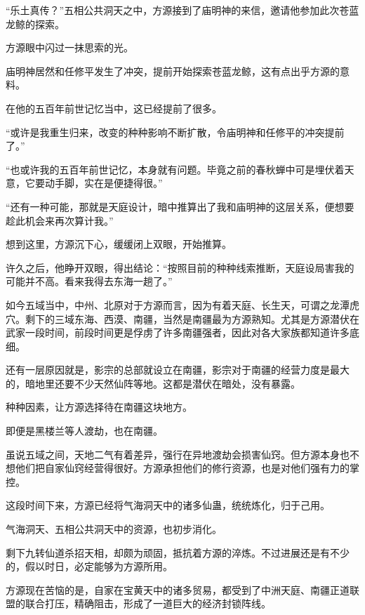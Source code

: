 
\begin{this_body}



“乐土真传？”五相公共洞天之中，方源接到了庙明神的来信，邀请他参加此次苍蓝龙鲸的探索。

方源眼中闪过一抹思索的光。

庙明神居然和任修平发生了冲突，提前开始探索苍蓝龙鲸，这有点出乎方源的意料。

在他的五百年前世记忆当中，这已经提前了很多。

“或许是我重生归来，改变的种种影响不断扩散，令庙明神和任修平的冲突提前了。”

“也或许我的五百年前世记忆，本身就有问题。毕竟之前的春秋蝉中可是埋伏着天意，它要动手脚，实在是便捷得很。”

“还有一种可能，那就是天庭设计，暗中推算出了我和庙明神的这层关系，便想要趁此机会来再次算计我。”

想到这里，方源沉下心，缓缓闭上双眼，开始推算。

许久之后，他睁开双眼，得出结论：“按照目前的种种线索推断，天庭设局害我的可能并不高。看来我得去东海一趟了。”

如今五域当中，中州、北原对于方源而言，因为有着天庭、长生天，可谓之龙潭虎穴。剩下的三域东海、西漠、南疆，当然是南疆最为方源熟知。尤其是方源潜伏在武家一段时间，前段时间更是俘虏了许多南疆强者，因此对各大家族都知道许多底细。

还有一层原因就是，影宗的总部就设立在南疆，影宗对于南疆的经营力度是最大的，暗地里还要不少天然仙阵等地。这都是潜伏在暗处，没有暴露。

种种因素，让方源选择待在南疆这块地方。

即便是黑楼兰等人渡劫，也在南疆。

虽说五域之间，天地二气有着差异，强行在异地渡劫会损害仙窍。但方源本身也不想他们把自家仙窍经营得很好。方源承担他们的修行资源，也是对他们强有力的掌控。

这段时间下来，方源已经将气海洞天中的诸多仙蛊，统统炼化，归于己用。

气海洞天、五相公共洞天中的资源，也初步消化。

剩下九转仙道杀招天相，却颇为顽固，抵抗着方源的淬炼。不过进展还是有不少的，假以时日，必定能够为方源所用。

方源现在苦恼的是，自家在宝黄天中的诸多贸易，都受到了中洲天庭、南疆正道联盟的联合打压，精确阻击，形成了一道巨大的经济封锁阵线。


\end{this_body}
